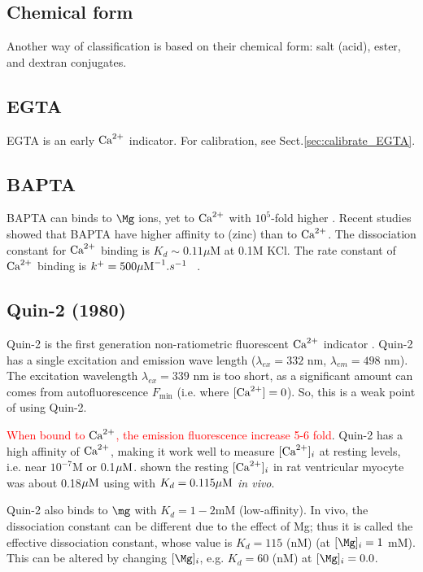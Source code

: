 \subsection{Chemical form}

Another way of classification is based on their chemical form: salt (acid),
ester, and dextran conjugates.

\subsection{EGTA}

EGTA is an early ${\text{Ca}^{2+}}$ indicator. For
calibration, see Sect.\ref{sec:calibrate_EGTA}.

\subsection{BAPTA}
\label{sec:bapta}

BAPTA can binds to $\Mg$ ions, yet to ${\text{Ca}^{2+}}$ with $10^5$-fold higher
\citep{tsien1980}.
Recent studies showed that BAPTA have higher affinity to  (zinc) than
to ${\text{Ca}^{2+}}$. The dissociation constant for ${\text{Ca}^{2+}}$ binding is $K_d\sim 0.11\mu$M
at 0.1M KCl. The rate constant of ${\text{Ca}^{2+}}$ binding is
$k^+ = 500{\mu\text{M}}^{-1}.s^{-1}$ ~\citep{pethig1989}.


\subsection{Quin-2 (1980)}
\label{sec:quin-2}

Quin-2 is the first generation non-ratiometric fluorescent ${\text{Ca}^{2+}}$ indicator
\citep{tsien1980, tsien1982,tsien1989}. Quin-2 has a single excitation and
emission wave length ($\lambda_{ex}=332$ nm, $\lambda_{em}=498$ nm).
The excitation wavelength $\lambda_{ex}=339$ nm is too short, as a significant
amount can comes from autofluorescence $F_\min$ (i.e. where $[{\text{Ca}^{2+}}]=0$). So, this
is a weak point of using Quin-2.

\textcolor{red}{When bound to ${\text{Ca}^{2+}}$, the emission fluorescence increase 5-6
fold}.
Quin-2 has a high affinity of ${\text{Ca}^{2+}}$, making it work well to measure $[{\text{Ca}^{2+}}]_i$ at
resting levels, i.e. near $10^{-7}$M or 0.1${\mu\text{M}}$. \citep{sheu1984} shown the
resting $[{\text{Ca}^{2+}}]_i$ in rat ventricular myocyte was about 0.18${\mu\text{M}}$ using with
$K_d = 0.115{\mu\text{M}}$  {\it in
  vivo}. 
  
Quin-2 also binds to $\mg$ with $K_d=1-2$mM (low-affinity). In vivo, the
dissociation constant can be different due to the effect of Mg; thus it is
called the effective dissociation  constant, whose value is $K_d = 115$ (nM) (at
$[\Mg]_i=1$ mM). This can be altered by changing $[\Mg]_i$, e.g. $K_d=60$ (nM)
at $[\Mg]_i=0.0$.

